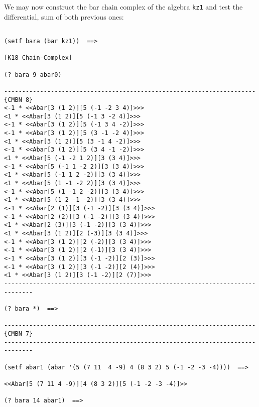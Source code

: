 We may now construct the bar chain complex of the algebra {\tt kz1} and test
the differential, sum of  both previous ones:
{\footnotesize\begin{verbatim}

(setf bara (bar kz1))  ==>

[K18 Chain-Complex]

(? bara 9 abar0)

----------------------------------------------------------------------{CMBN 8}
<-1 * <<Abar[3 (1 2)][5 (-1 -2 3 4)]>>>
<1 * <<Abar[3 (1 2)][5 (-1 3 -2 4)]>>>
<-1 * <<Abar[3 (1 2)][5 (-1 3 4 -2)]>>>
<-1 * <<Abar[3 (1 2)][5 (3 -1 -2 4)]>>>
<1 * <<Abar[3 (1 2)][5 (3 -1 4 -2)]>>>
<-1 * <<Abar[3 (1 2)][5 (3 4 -1 -2)]>>>
<1 * <<Abar[5 (-1 -2 1 2)][3 (3 4)]>>>
<-1 * <<Abar[5 (-1 1 -2 2)][3 (3 4)]>>>
<1 * <<Abar[5 (-1 1 2 -2)][3 (3 4)]>>>
<1 * <<Abar[5 (1 -1 -2 2)][3 (3 4)]>>>
<-1 * <<Abar[5 (1 -1 2 -2)][3 (3 4)]>>>
<1 * <<Abar[5 (1 2 -1 -2)][3 (3 4)]>>>
<-1 * <<Abar[2 (1)][3 (-1 -2)][3 (3 4)]>>>
<-1 * <<Abar[2 (2)][3 (-1 -2)][3 (3 4)]>>>
<1 * <<Abar[2 (3)][3 (-1 -2)][3 (3 4)]>>>
<1 * <<Abar[3 (1 2)][2 (-3)][3 (3 4)]>>>
<-1 * <<Abar[3 (1 2)][2 (-2)][3 (3 4)]>>>
<-1 * <<Abar[3 (1 2)][2 (-1)][3 (3 4)]>>>
<-1 * <<Abar[3 (1 2)][3 (-1 -2)][2 (3)]>>>
<-1 * <<Abar[3 (1 2)][3 (-1 -2)][2 (4)]>>>
<1 * <<Abar[3 (1 2)][3 (-1 -2)][2 (7)]>>>
------------------------------------------------------------------------------

(? bara *)  ==>

----------------------------------------------------------------------{CMBN 7}
------------------------------------------------------------------------------

(setf abar1 (abar '(5 (7 11  4 -9) 4 (8 3 2) 5 (-1 -2 -3 -4))))  ==>

<<Abar[5 (7 11 4 -9)][4 (8 3 2)][5 (-1 -2 -3 -4)]>>

(? bara 14 abar1)  ==>


\end{verbatim}}
